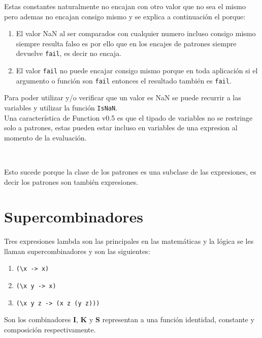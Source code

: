       Estas constantes naturalmente no encajan con otro valor que no sea el mismo pero ademas no encajan consigo mismo y se explica a continuación el porque:
      
      \begin{enumerate}
         \item El valor NaN al ser comparados con cualquier numero incluso consigo mismo siempre resulta falso es por ello que en los encajes de patrones siempre devuelve \texttt{fail}, es decir no encaja.
         \item El valor \texttt{fail} no puede encajar consigo mismo porque en toda aplicación si el argumento o función son \texttt{fail} entonces el resultado también es \texttt{fail}.
      \end{enumerate}
      
      Para poder utilizar y/o verificar que un valor es NaN se puede recurrir a las variables y utilizar la función \texttt{IsNaN}.
      \\
      
      Una característica de Function v0.5 es que el tipado de variables no se restringe solo a patrones, estas pueden estar incluso en variables de una expresion al momento de la evaluación.
      
      \begin{fxcode}
         \\
      \end{fxcode}
      
      Esto sucede porque la clase de los patrones es una subclase de las expresiones, es decir los patrones son también expresiones.
      
   \section{Supercombinadores}
      Tres expresiones lambda son las principales en las matemáticas y la lógica se les llaman supercombinadores y son las siguientes:
      
      \begin{enumerate}
         \item \texttt{(\textbackslash x ->~x)}
         \item \texttt{(\textbackslash x y ->~x)}
         \item \texttt{(\textbackslash x y z ->~(x z (y z)))}
      \end{enumerate}
      
      Son los combinadores {\bf I}, {\bf K} y {\bf S} representan a una función identidad, constante y composición respectivamente.
      \\
      
